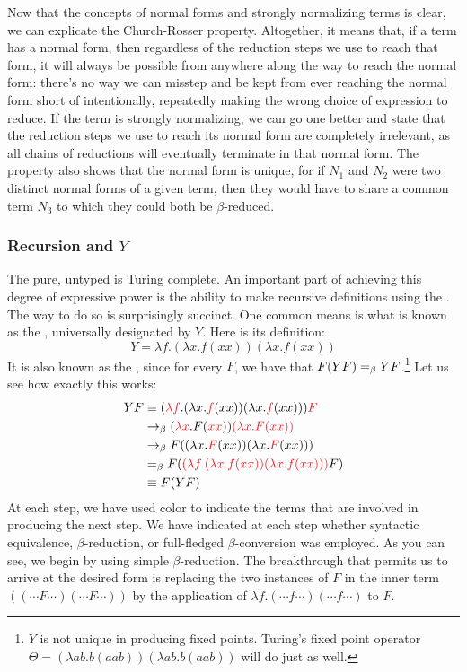 Now that the concepts of normal forms and strongly normalizing terms is clear, we can explicate the Church-Rosser property. Altogether, it means that, if a term has a normal form, then regardless of the reduction steps we use to reach that form, it will always be possible from anywhere along the way to reach the normal form: there's no way we can misstep and be kept from ever reaching the normal form short of intentionally, repeatedly making the wrong choice of expression to reduce. If the term is strongly normalizing, we can go one better and state that the reduction steps we use to reach its normal form are completely irrelevant, as all chains of reductions will eventually terminate in that normal form. The property also shows that the normal form is unique, for if $N_{1}$ and $N_{2}$ were two distinct normal forms of a given term, then they would have to share a common term $N_{3}$ to which they could both be $\beta$-reduced.

\subsubsection{Recursion and $Y$}\label{untyped:y}
The pure, untyped \lambdacalc is Turing complete. An important part of achieving this degree of expressive power is the ability to make recursive definitions using the \lambdacalc{}. The way to do so is surprisingly succinct. One common means is what is known as the , universally designated by $Y$. Here is its definition:
\[
Y = \lambda f. (\lambda x.f(xx))(\lambda x.f(xx))
\]
It is also known as the , since for every $F$, we have that $F(YF) =_{\beta} YF$.\footnote{$Y$ is not unique in producing fixed points. Turing's fixed point operator $\Theta = (\lambda a b . b (aab)) (\lambda a b . b (aab))$ will do just as well.} Let us see how exactly this works:
\begin{align*}
Y F &\equiv (\redex{\lambda f}. (\lambda x.\redex{f}(xx))(\lambda x.\redex{f}(xx))) \redex{F} \\
&\betared (\redex{\lambda x}. F(\redex{x}\redex{x})) \redex{(\lambda x. F(xx))}\\
&\betared F ( (\lambda x. \redex{F}(xx)) (\lambda x. \redex{F}(xx)) )\\
&\betacon F (\redex{(\lambda f. (\lambda x.f(xx))(\lambda x.f(xx)))} F)\\
&\equiv F (Y F)
\end{align*}
At each step, we have used color to indicate the terms that are involved in producing the next step. We have indicated at each step whether syntactic equivalence, $\beta$-reduction, or full-fledged $\beta$-conversion was employed. As you can see, we begin by using simple $\beta$-reduction. The breakthrough that permits us to arrive at the desired form is replacing the two instances of $F$ in the inner term $((\dotsb F \dotsb)(\dotsb F \dotsb))$ by the application of $\lambda f. (\dotsb f \dotsb)(\dotsb f \dotsb)$ to $F$.

